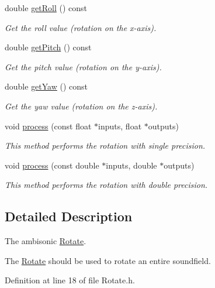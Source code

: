\begin{DoxyCompactItemize}
double \hyperlink{class_hoa3_d_1_1_rotate_a4da29df01f2c7311490df11d4322b5f8}{get\-Roll} () const 
\begin{DoxyCompactList}\small\item\em Get the roll value (rotation on the x-\/axis). \end{DoxyCompactList}\item 
double \hyperlink{class_hoa3_d_1_1_rotate_afe1e5ccea5d375b082b7df2b8c8b972a}{get\-Pitch} () const 
\begin{DoxyCompactList}\small\item\em Get the pitch value (rotation on the y-\/axis). \end{DoxyCompactList}\item 
double \hyperlink{class_hoa3_d_1_1_rotate_a386f1fba4ceab4c2e243b7a222124d7e}{get\-Yaw} () const 
\begin{DoxyCompactList}\small\item\em Get the yaw value (rotation on the z-\/axis). \end{DoxyCompactList}\item 
void \hyperlink{class_hoa3_d_1_1_rotate_a9851055e9dbe808578e435c65f22c06a}{process} (const float $\ast$inputs, float $\ast$outputs)
\begin{DoxyCompactList}\small\item\em This method performs the rotation with single precision. \end{DoxyCompactList}\item 
void \hyperlink{class_hoa3_d_1_1_rotate_a395dafa6cc2d92562e6ac8044a438b2c}{process} (const double $\ast$inputs, double $\ast$outputs)
\begin{DoxyCompactList}\small\item\em This method performs the rotation with double precision. \end{DoxyCompactList}\end{DoxyCompactItemize}


\subsection{Detailed Description}
The ambisonic \hyperlink{class_hoa3_d_1_1_rotate}{Rotate}. 

The \hyperlink{class_hoa3_d_1_1_rotate}{Rotate} should be used to rotate an entire soundfield. 

Definition at line 18 of file Rotate.\-h.



